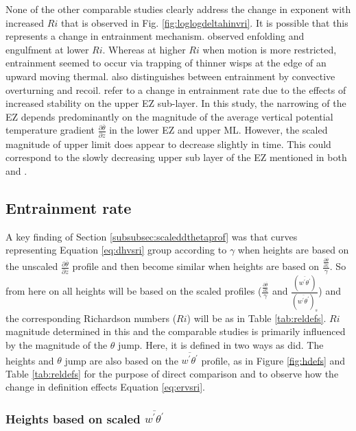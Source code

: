 None of the other comparable studies clearly address the change in exponent with increased $Ri$ that is observed in Fig. \ref{fig:loglogdeltahinvri}.  It is possible that this represents a change in entrainment mechanism. \cite{SullMoengStev} observed enfolding and engulfment at lower $Ri$.  Whereas at higher $Ri$ when motion is more restricted, entrainment seemed to occur via trapping of thinner wisps at the edge of an upward moving thermal.  \cite{Turner86} also distinguishes between entrainment by convective overturning and recoil. \cite{GarciaMellado} refer to a change in entrainment rate due to the effects of increased stability on the upper EZ sub-layer.  In this study, the narrowing of the EZ depends predominantly on the magnitude of the average vertical potential temperature gradient $\frac{\partial \overline{\theta}}{\partial z}$ in the lower EZ and upper ML.  However, the scaled magnitude of upper limit does appear to decrease slightly in time.  This could correspond to the slowly decreasing upper sub layer of the EZ mentioned in both \cite{GarciaMellado} and \cite{FedConzMir04}.\\

\subsection{Entrainment rate}

A key finding of Section \ref{subsubsec:scaleddthetaprof} was that curves representing Equation \ref{eq:dhvsri} group according
to $\gamma$ when heights are based on the unscaled $\frac{\partial \overline{\theta}}{\partial z}$ profile and then become similar
when heights are based on $\frac{\frac{\partial \overline{\theta}}{\partial z}}{\gamma}$.  So from here on all heights will be based on the scaled profiles ($\frac{\frac{\partial \overline{\theta}}{\partial z}}{\gamma}$ and $\frac{(\overline{w^{'}\theta^{'}})}{(\overline{w^{'}\theta^{'}})_{s}}$) and the corresponding Richardson numbers ($Ri$) will be as in Table \ref{tab:reldefs}.  $Ri$ magnitude determined in this and the comparable studies is primarily influenced by the magnitude of the $\theta$ jump.  Here, it is defined in two ways as \cite{FedConzMir04} did.  The heights and $\theta$ jump are also based on the $\overline{w^{'}\theta^{'}}$ profile, as in Figure \ref{fig:hdefs} and Table \ref{tab:reldefs} for the purpose of direct comparison and to observe how the change in definition effects Equation \ref{eq:ervsri}.

\subsubsection{Heights based on scaled $\overline{w^{'}\theta^{'}}$}

